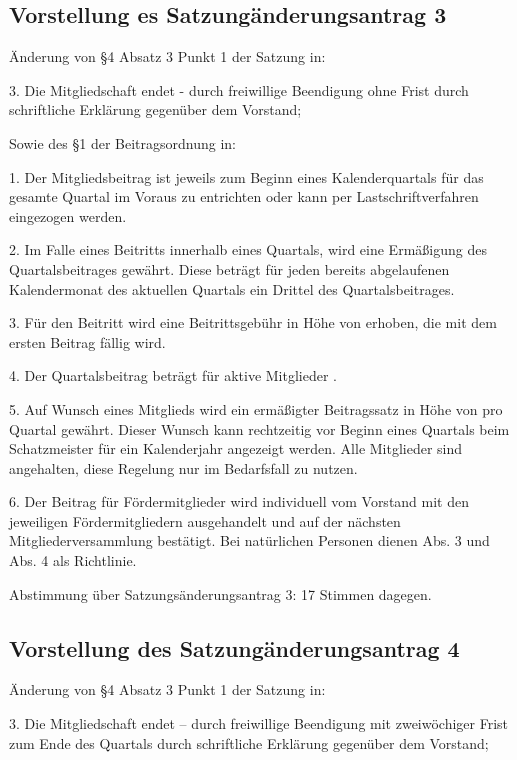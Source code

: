 \documentclass[a4paper,12pt,titlepage]{scrartcl}
\begin{document}
\subsection{Vorstellung es Satzungänderungsantrag 3}
Änderung von §4 Absatz 3 Punkt 1 der Satzung in:

\begin{displayquote}
3. Die Mitgliedschaft endet 
	- durch freiwillige Beendigung ohne Frist durch schriftliche Erklärung gegenüber dem Vorstand;
\end{displayquote}

Sowie des §1 der Beitragsordnung in: 
\begin{displayquote}
1. Der Mitgliedsbeitrag ist jeweils zum Beginn eines Kalenderquartals für das gesamte Quartal im Voraus zu entrichten oder kann per Lastschriftverfahren eingezogen werden.

2. Im Falle eines Beitritts innerhalb eines Quartals, wird eine Ermäßigung des Quartalsbeitrages gewährt. Diese beträgt für jeden bereits abgelaufenen Kalendermonat des aktuellen Quartals ein Drittel des Quartalsbeitrages.

3. Für den Beitritt wird eine Beitrittsgebühr in Höhe von  erhoben, die mit dem ersten Beitrag fällig wird.

4. Der Quartalsbeitrag beträgt für aktive Mitglieder .

5. Auf Wunsch eines Mitglieds wird ein ermäßigter Beitragssatz in Höhe von  pro Quartal gewährt. Dieser Wunsch kann rechtzeitig vor Beginn eines Quartals beim Schatzmeister für ein Kalenderjahr angezeigt werden. Alle Mitglieder sind angehalten, diese Regelung nur im Bedarfsfall zu nutzen.

6. Der Beitrag für Fördermitglieder wird individuell vom Vorstand mit den jeweiligen Fördermitgliedern ausgehandelt und auf der nächsten Mitgliederversammlung bestätigt. Bei natürlichen Personen dienen Abs. 3 und Abs. 4 als Richtlinie.
\end{displayquote}

Abstimmung über Satzungsänderungsantrag 3: 17 Stimmen dagegen.

\subsection{Vorstellung des Satzungänderungsantrag 4}
Änderung von §4  Absatz 3 Punkt 1 der Satzung in:
\begin{displayquote}
3. Die Mitgliedschaft endet – durch freiwillige Beendigung mit zweiwöchiger Frist zum Ende des Quartals durch schriftliche Erklärung gegenüber dem Vorstand;
\end{displayquote}
\end{document}
